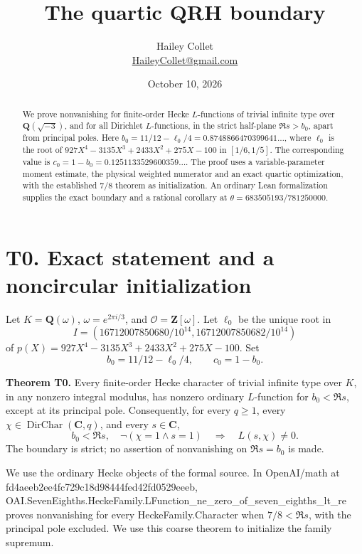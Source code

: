 \documentclass[11pt,a4paper]{article}
\title{\vspace{-1.3em}The quartic QRH boundary}
\author{Hailey Collet\\\small\href{mailto:HaileyCollet@gmail.com}{HaileyCollet@gmail.com}}
\date{October 10, 2026}
\newcommand{\sourcecode}[1]{{\small\ttfamily #1}}
\begin{document}
\maketitle
\vspace{-1.5em}
\begin{abstract}
We prove nonvanishing for finite-order Hecke $L$-functions of trivial infinite type over $\mathbf{Q}(\sqrt{-3})$, and for all Dirichlet $L$-functions, in the strict half-plane $\Re s>b_0$, apart from principal poles. Here $b_0=11/12-\ell_0/4=0.8748866470399641\ldots$, where $\ell_0$ is the root of $927X^4-3135X^3+2433X^2+275X-100$ in $[1/6,1/5]$. The corresponding value is $c_0=1-b_0=0.1251133529600359\ldots$. The proof uses a variable-parameter moment estimate, the physical weighted numerator and an exact quartic optimization, with the established $7/8$ theorem as initialization. An ordinary Lean formalization supplies the exact boundary and a rational corollary at $\theta=683505193/781250000$.
\end{abstract}

\hypertarget{t0.-exact-statement-and-a-noncircular-initialization}{%
\section{T0. Exact statement and a noncircular
initialization}\label{t0.-exact-statement-and-a-noncircular-initialization}}

Let \(K=\mathbf Q(\omega)\), \(\omega=e^{2\pi i/3}\), and
\(\mathcal O=\mathbf Z[\omega]\). Let \(\ell_0\) be the unique root in
\[
I=(16712007850680/10^{14},16712007850682/10^{14})
\] of \(p(X)=927X^4-3135X^3+2433X^2+275X-100\). Set \[
b_0=11/12-\ell_0/4,\qquad c_0=1-b_0.
\]

\textbf{Theorem T0.} Every finite-order Hecke character of trivial
infinite type over \(K\), in any nonzero integral modulus, has nonzero
ordinary \(L\)-function for \(b_0<\Re s\), except at its principal pole.
Consequently, for every \(q\ge1\), every
\(\chi\in\operatorname{DirChar}(\mathbf C,\allowbreak{}q)\), and every
\(s\in\mathbf C\), \[
b_0<\Re s,\quad\neg(\chi=1\land s=1)
\quad\Longrightarrow\quad L(s,\chi)\ne0.
\] The boundary is strict; no assertion of nonvanishing on \(\Re s=b_0\)
is made.

We use the ordinary Hecke objects of the formal source. In OpenAI/math
at \sourcecode{fd4aeeb2\allowbreak{}ee4fc729\allowbreak{}c18d9844\allowbreak{}4fed42fd\allowbreak{}0529eeeb},
\sourcecode{OAI.\allowbreak{}Seven\allowbreak{}Eighths.\allowbreak{}Hecke\allowbreak{}Family.\allowbreak{}LFunction\_\allowbreak{}ne\_\allowbreak{}zero\_\allowbreak{}of\_\allowbreak{}seven\_\allowbreak{}eighths\_\allowbreak{}lt\_\allowbreak{}re}
proves nonvanishing for every \sourcecode{Hecke\allowbreak{}Family.\allowbreak{}Character} when
\(7/8<\Re s\), with the principal pole excluded. We use this coarse
theorem to initialize the family supremum.
\end{document}
